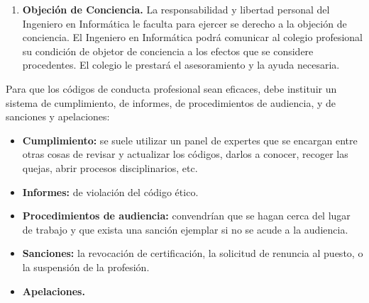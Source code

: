 \begin{enumerate}[label=\textbf{\arabic*.}]
    \item\textbf{Objeción de Conciencia.} La responsabilidad y libertad personal del Ingeniero en Informática le faculta para ejercer se derecho a la objeción de conciencia. El Ingeniero en Informática podrá comunicar al colegio profesional su condición de objetor de conciencia a los efectos que se considere procedentes. El colegio le prestará el asesoramiento y la ayuda necesaria.
\end{enumerate}

Para que los códigos de conducta profesional sean eficaces, debe instituir un sistema de cumplimiento, de informes, de procedimientos de audiencia, y de sanciones y apelaciones:
\begin{itemize}
    \item\textbf{Cumplimiento:} se suele utilizar un panel de expertes que se encargan entre otras cosas de revisar y actualizar los códigos, darlos a conocer, recoger las quejas, abrir procesos disciplinarios, etc.
    \item\textbf{Informes:} de violación del código ético.
    \item\textbf{Procedimientos de audiencia:} convendrían que se hagan cerca del lugar de trabajo y que exista una sanción ejemplar si no se acude a la audiencia.
    \item\textbf{Sanciones:} la revocación de certificación, la solicitud de renuncia al puesto, o la suspensión de la profesión.
    \item\textbf{Apelaciones.}
\end{itemize}
